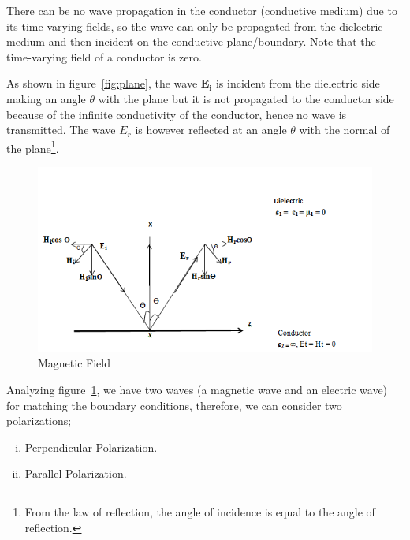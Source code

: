 There can be no wave propagation in the conductor (conductive medium) due to its time-varying fields, so the wave can only be propagated from the dielectric medium and then incident on the conductive plane/boundary. Note that the time-varying field of a conductor is zero.

As shown in figure~\ref{fig:plane}, the wave $\boldsymbol{E_i}$  is incident from the dielectric side making an angle $ \theta $ with the plane but it is not propagated to the conductor side because of the infinite conductivity of the conductor, hence no wave is transmitted. The wave $E_r$ is however reflected at an angle $ \theta $ with the normal of the plane\footnote{From the law of reflection, the angle of incidence is equal to the angle of reflection.}.
\begin{figure}[h]
\centering
\includegraphics[width=1\linewidth]{./graphics/fields}
\caption{Magnetic Field}
\label{fig:fields}
\end{figure}

Analyzing figure~\ref{fig:fields}, we have two waves (a magnetic wave and an electric wave) for matching the boundary conditions, therefore, we can consider two polarizations;
\begin{enumerate}[(i)]
\item Perpendicular Polarization. 
\item  Parallel Polarization.
\end{enumerate}

